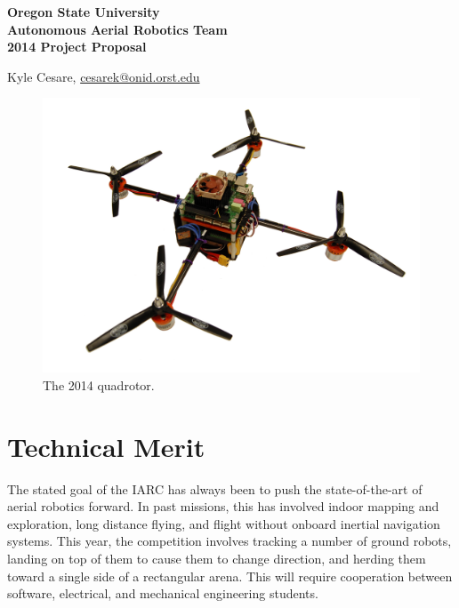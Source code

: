 \documentclass[12pt,letterpaper]{article}
\begin{document}
\begin{center}
	{\bf\Large Oregon State University \\
          Autonomous Aerial Robotics Team \\
          2014 Project Proposal
	  \\ [1em]
	}

        {\small
          Kyle Cesare, \url{cesarek@onid.orst.edu}
        }
\end{center}


\begin{abstract}
The Oregon State University Autonomous Aerial Robotics Team builds autonomous
aerial vehicles to compete in the International Aerial Robotics Competition. The
competition is structured to push the current capabilities of autonomous aerial
vehicles. The team joins computer scientists, electrical engineers, and
mechanical engineers to design, build, and program these aerial vehicles from
start to finish. It is a great learning experience for everyone involved. The
team participates in a number of outreach events to teach the community about
robotics.  \end{abstract}

\begin{figure}[h]
  \centering
  \includegraphics[width=5in]{quad}
  \caption{The 2014 quadrotor.}
\end{figure}

\section*{Technical Merit}
The stated goal of the IARC has always been to push the state-of-the-art of
aerial robotics forward. In past missions, this has involved indoor mapping and
exploration, long distance flying, and flight without onboard inertial
navigation systems. This year, the competition involves tracking a number of
ground robots, landing on top of them to cause them to change direction, and
herding them toward a single side of a rectangular arena. This will require
cooperation between software, electrical, and mechanical engineering students.
\end{document}
